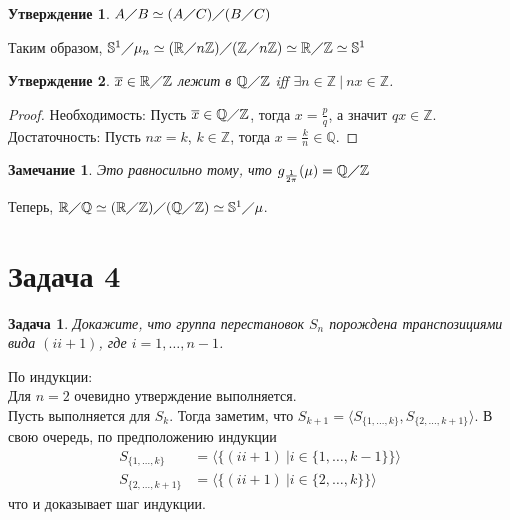 \documentclass{article}
\newtheorem{task}{Задача}
\newtheorem{statement}{Утверждение}
\newtheorem{remark}{Замечание}
\newcommand{\gen}[1]{\langle #1 \rangle}
\newcommand{\srange}[2]{\{#1, \dots, #2\}}
\newcommand{\range}[2]{#1, \dots, #2}
\newcommand{\isomorphic}{\simeq}
\newcommand{\sphere}[1]{\mathbb{S}^{#1}}
\newcommand{\quotient}[2]{#1 \diagup #2}
\newcommand{\R}{\mathbb{R}}
\newcommand{\Q}{\mathbb{Q}}
\newcommand{\Z}{\mathbb{Z}}
\newcommand{\Zn}[1]{\quotient{\Z}{#1\Z}}
\newcommand{\class}[1]{\overline{#1}}
\begin{document}
\begin{statement}
$\quotient{A}{B} \isomorphic \quotient{(\quotient{A}{C})}{(\quotient{B}{C})}$
\end{statement}



Таким образом, 
\begin{math}
    \quotient{\sphere{1}}{\mu_n}                \isomorphic 
    \quotient{(\quotient{\R}{n\Z})}{(\Zn{n})}   \isomorphic 
    \quotient{\R}{\Z}                           \isomorphic 
    \sphere{1}
\end{math}

\begin{statement}
$\class{x} \in \quotient{\R}{\Z}$ лежит в $\quotient{\Q}{\Z}$ iff $\exists n \in \Z ~ | ~ n x \in \Z$. 
\end{statement}

\begin{proof}
    Необходимость: 
    Пусть $\class{x} \in \quotient{\Q}{\Z}$, тогда $x = \frac{p}{q}$, а значит $q x \in \Z$.
    Достаточность:
    Пусть $n x = k$, $k \in \Z$, тогда $x = \frac{k}{n} \in \Q$.
\end{proof}

\begin{remark}
Это равносильно тому, что $g_{\frac{1}{2 \pi}} (\mu) = \quotient{\Q}{\Z}$
\end{remark}

Теперь, 
\begin{math}
    \quotient{\R}{\Q} \isomorphic
    \quotient{(\quotient{\R}{\Z})}{(\quotient{\Q}{\Z})} \isomorphic
    \quotient{\sphere{1}}{\mu}
\end{math}.

\section*{Задача 4}

\begin{task}
Докажите, что группа перестановок $S_n$ порождена транспозициями вида $(i i + 1)$, где $i = \range{1}{n - 1}$.
\end{task}

По индукции: \\ 

Для $n = 2$ очевидно утверждение выполняется.\\

Пусть выполняется для $S_k$. 
Тогда заметим, что $S_{k + 1} = \gen{S_{\srange{1}{k}}, S_{\srange{2}{k + 1}}}$.
В свою очередь, по предположению индукции 
\begin{align*}
    S_{\srange{1}{k}} &= \gen{\{(i i + 1) ~ | i \in \srange{1}{k - 1}\}} \\
    S_{\srange{2}{k + 1}} &= \gen{\{(i i + 1) ~ | i \in \srange{2}{k}\}}
\end{align*}
что и доказывает шаг индукции.
\end{document}
